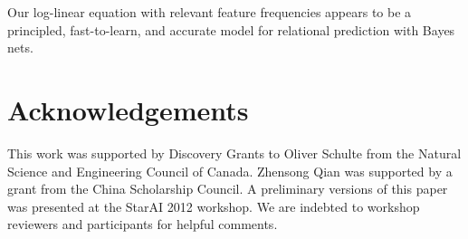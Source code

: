 \documentclass[runningheads,a4paper]{llncs}
\begin{document}
Our log-linear equation with relevant feature frequencies appears to be a principled, fast-to-learn, and accurate model for relational prediction with Bayes nets.




\section*{Acknowledgements} This work was supported by Discovery Grants to Oliver Schulte from the Natural Science and Engineering Council of Canada. Zhensong Qian was supported by a grant from the China Scholarship Council. A preliminary versions of this paper was presented at the StarAI 2012 workshop. We are indebted to workshop reviewers and participants for helpful comments.


\end{document}
